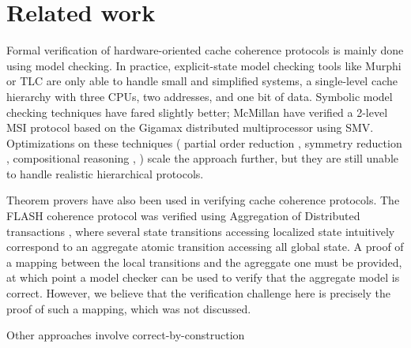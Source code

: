 \section{Related work}
\label{relatedWork}

Formal verification of hardware-oriented cache coherence protocols is mainly
done using model checking. In practice, explicit-state model checking tools like
Murphi \cite{murphi} or TLC \cite{tlc} are only able to handle small and
simplified systems, \eg{} a single-level cache hierarchy with three CPUs, two
addresses, and one bit of data. Symbolic model checking techniques have fared
slightly better; McMillan \etal{} have verified a 2-level MSI protocol based on
the Gigamax distributed multiprocessor using SMV.  Optimizations on these techniques
(\eg{} partial order reduction \cite{part}, symmetry reduction \cite{sym1,
  sym2}, compositional reasoning \cite{somethink}, \etc{}) scale the approach
further, but they are still unable to handle realistic hierarchical protocols.

Theorem provers have also been used in verifying cache coherence protocols. The
FLASH coherence protocol \cite{flash} was verified using Aggregation of
Distributed  transactions \cite{park}, where several state transitions accessing
localized state intuitively correspond to an aggregate atomic transition
accessing all global state. A proof of a mapping between the local transitions
and the agreggate one must be provided, at which point a model checker can
be used to verify that the aggregate model is correct. However, we believe that the
verification challenge here is precisely the proof of such a mapping, which was
not discussed.

Other approaches involve correct-by-construction


